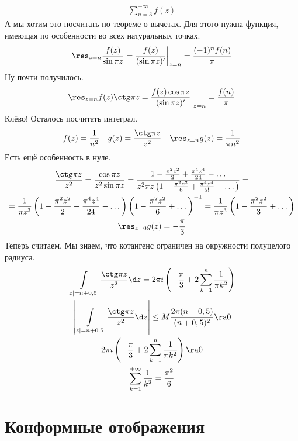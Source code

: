 \begin{exmp}
	\begin{gather*}
		\sum_{n=3}^{+\infty} f(z)
	\end{gather*}
	А мы хотим это посчитать по теореме о вычетах.
	Для этого нужна функция, имеющая по особенности во всех натуральных точках.
	\begin{gather*}
		\res_{z=n} \frac{f(z)}{\sin \pi z} = \frac{f(z)}{(\sin \pi z)'} \biggr|_{z=n} = \frac{(-1)^n f(n)}{\pi}
	\end{gather*}
	Ну почти получилось.
	\begin{gather*}
		\res_{z=n} f(z) \ctg \pi z = \frac{f(z) \cos \pi z}{(\sin \pi z)'} \biggr|_{z=n} = \frac{f(n)}\pi
	\end{gather*}
	Клёво! Осталось посчитать интеграл.
	\begin{gather*}
		f(z) = \frac1{n^2} \quad g(z) = \frac{\ctg \pi z}{z^2} \quad \res_{z=n} g(z) = \frac1{\pi n^2}
	\end{gather*}
	Есть ещё особенность в нуле.
	\begin{gather*}
		\frac{\ctg \pi z}{z^2} = \frac{\cos \pi z}{z^2 \sin \pi z}
		= \frac{1 - \frac{\pi^2 z^2}2 + \frac{\pi^4 z^4}{24} - \dots}
		{z^2 \pi z \left(1 - \frac{\pi^2 z^2}6 + \frac{\pi^4 z^4}{5!} - \dots\right)} = \\
		= \frac1{\pi z^3} \left(1 - \frac{\pi^2 z^2}2 + \frac{\pi^4 z^4}{24} - \dots\right)
		\left(1 - \frac{\pi^2 z^2}6 + \dots\right)^{-1}
		= \frac1{\pi z^3} \left(1 - \frac{\pi^2 z^2}3 + \dots\right) \\
		\res_{z=0} g(z) = -\frac{\pi}3
	\end{gather*}
	Теперь считаем. Мы знаем, что котангенс ограничен на окружности полуцелого радиуса.
	\begin{gather*}
		\int\limits_{|z|=n+0,5} \frac{\ctg \pi z}{z^2} \d z
		= 2\pi i \left(-\frac{\pi}3 + 2\sum_{k=1}^n \frac1{\pi k^2}\right) \\
		\left| \int\limits_{|z|=n+0.5} \frac{\ctg \pi z}{z^2} \d z \right|
		\le M \frac{2\pi (n + 0,5)}{(n + 0,5)^2} \ra 0 \\
		2\pi i \left(-\frac{\pi}3 + 2\sum_{k=1}^n \frac1{\pi k^2} \right) \ra 0 \\
		\sum_{k=1}^{+\infty} \frac1{k^2} = \frac{\pi^2}6
	\end{gather*}
\end{exmp}

\section{Конформные отображения}

